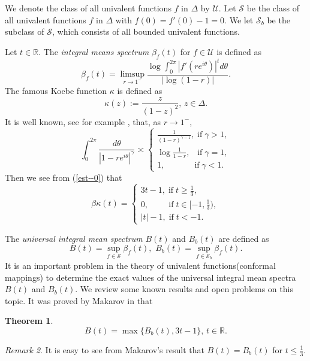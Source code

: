 \documentclass[11pt]{amsart}
\newtheorem{theorem}{Theorem}[section]
\theoremstyle{remark}
\newtheorem{remark}[theorem]{Remark}
\theoremstyle{claim}
\theoremstyle{definition}
\theoremstyle{problem}
\theoremstyle{conjecture}
\theoremstyle{question}
\numberwithin{equation}{section}
\begin{document}
We denote the class of all univalent functions $f$ in $\Delta$ by $\mathcal{U}$.  Let $\mathcal{S}$ be the class of all univalent functions $f$ in $\Delta$ with $f(0)=f'(0)-1=0$.   We let $\mathcal{S}_b$ be the subclass of $\mathcal{S}$, which consists of all bounded univalent functions.

Let $t\in \mathbb{R}$. The {\em integral means spectrum} $\beta_f(t)$ for $f\in \mathcal{U}$ is defined as
\begin{equation}
\beta_f(t)=\limsup_{r \rightarrow 1^{-}}\frac{\log \int_{0}^{2\pi} |f'(re^{i\theta})|^t d\theta}{|\log(1-r)|}.\nonumber
\end{equation}
The famous Koebe function $\kappa$ is defined as
$$\kappa(z):=\frac{z}{(1-z)^2},\, z\in \Delta.$$
It is well known, see for example \cite{Po-0}, that, as $r\rightarrow 1^{-}$,
\begin{equation}\label{est--0}
\int_{0}^{2\pi} \frac{d\theta}{|1-re^{i\theta}|^{\gamma}}\asymp
\begin{cases}
\frac{1}{(1-r)^{\gamma-1}}, \; \text{if} \; \gamma >1, \\
\log \frac{1}{1-r}, \; \;\;  \text{if} \; \gamma=1,\\
1, \; \quad\,\,\,\,\quad\;\; \text{if} \; \gamma<1.
\end{cases}
\end{equation}
Then we see from (\ref{est--0}) that
\begin{equation}\beta{\kappa}(t)=
\begin{cases}
3t-1, \; \text{if} \; t \geq \frac{1}{3}, \\
0, \; \quad\;\;\;\;  \text{if} \; t\in [-1, \frac{1}{3}),\\
|t|-1, \; \text{if} \; t<-1.
\end{cases} \nonumber
\end{equation}

The {\em universal integral mean spectrum} $B(t)$ and $B_b(t)$ are defined as
\begin{equation}
B(t)=\sup\limits_{f\in \mathcal{S}} \beta_f(t),\,\,B_b(t)=\sup\limits_{f\in \mathcal{S}_b} \beta_f(t).\nonumber
\end{equation}
It is an important problem in the theory of univalent functions(conformal mappings) to determine the exact values of the universal integral mean spectra $B(t)$ and $B_b(t)$. We review some known results and open problems on this topic. It was proved by Makarov in \cite{M} that
\begin{theorem}$$
B(t)=\max \{B_b(t), 3t-1\},\, t\in \mathbb{R}.$$
\end{theorem}
\begin{remark}
It is easy to see from  Makarov's result that $B(t)=B_b(t)$ for $t\leq \frac{1}{3}$.\end{remark}
\end{document}
